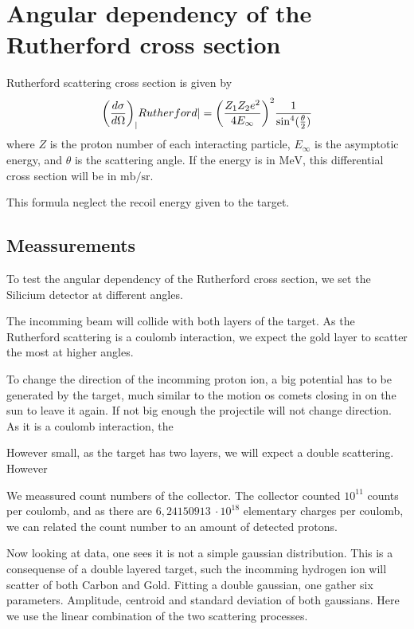 \section{Angular dependency of the Rutherford cross section}
Rutherford scattering cross section \parencite[p. 16]{noteBB} is given by
\begin{align}
    {\left( \diff[d]{\sigma}{\Omega} \right)}_|Rutherford| =
    {\left(\frac{Z_1Z_2 e^2}{4E_{\infty}} \right)}^2
    \frac{1}{{{\sin}^4(\frac{\theta}{2})}}
\end{align}
where $Z$ is the proton number of each interacting particle, $E_{\infty}$ is
the asymptotic energy, and $\theta$ is the scattering angle. If the energy is
in $\si{\mega\electronvolt}$, this differential cross section will be in
$\si{\milli\barn\per\steradian}$.

This formula neglect the recoil energy given to the target.



\subsection{Meassurements}
To test the angular dependency of the Rutherford cross section, we set the
Silicium detector at different angles.

The incomming beam will collide with both layers of the target. As the
Rutherford scattering is a coulomb interaction, we expect the gold layer to
scatter the most at higher angles.

To change the direction of the incomming proton ion, a big potential has to be
generated by the target, much similar to the motion os comets closing in on the
sun to leave it again. If not big enough the projectile will not change
direction. As it is a coulomb interaction, the 

However small, as the target has two layers, we will expect a double scattering. However







We meassured count numbers of the collector. The collector counted $10^{11}$
counts per coulomb, and as there are $6,24150913\ \cdot10^{18}$ elementary
charges per coulomb, we can related the count number to an amount of detected
protons.

Now looking at data, one sees it is not a simple gaussian distribution. This is
a consequense of a double layered target, such the incomming hydrogen ion will
scatter of both Carbon and Gold. Fitting a double gaussian, one gather
six parameters. Amplitude, centroid and standard deviation of both gaussians.
Here we use the linear combination of the two scattering processes. 

